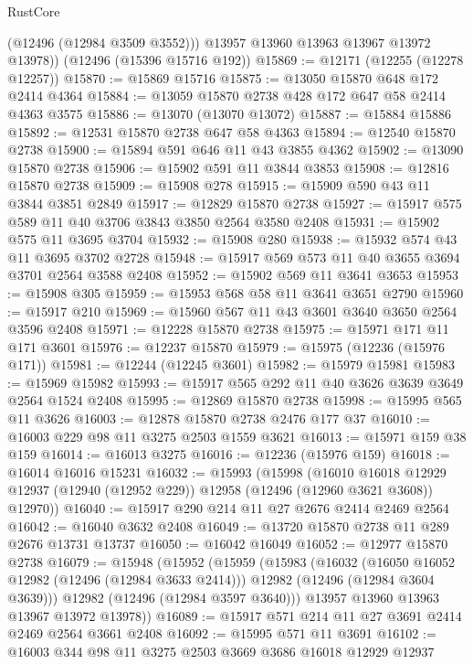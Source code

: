 \begin{lexlean}{RustCore}
\begin{coremodule}
          (@12496 (@12984 @3509 @3552)))
        @13957
        @13960
        @13963
        @13967
        @13972
        @13978))
    (@12496 (@15396 @15716 @192))
@15869 := @12171 (@12255 (@12278 @12257))
@15870 := @15869 @15716
@15875 := @13050 @15870 @648 @172 @2414 @4364
@15884 := @13059 @15870 @2738 @428 @172 @647 @58 @2414 @4363 @3575
@15886 := @13070 (@13070 @13072)
@15887 := @15884 @15886
@15892 := @12531 @15870 @2738 @647 @58 @4363
@15894 := @12540 @15870 @2738
@15900 := @15894 @591 @646 @11 @43 @3855 @4362
@15902 := @13090 @15870 @2738
@15906 := @15902 @591 @11 @3844 @3853
@15908 := @12816 @15870 @2738
@15909 := @15908 @278
@15915 := @15909 @590 @43 @11 @3844 @3851 @2849
@15917 := @12829 @15870 @2738
@15927 := @15917 @575 @589 @11 @40 @3706 @3843 @3850 @2564 @3580 @2408
@15931 := @15902 @575 @11 @3695 @3704
@15932 := @15908 @280
@15938 := @15932 @574 @43 @11 @3695 @3702 @2728
@15948 := @15917 @569 @573 @11 @40 @3655 @3694 @3701 @2564 @3588 @2408
@15952 := @15902 @569 @11 @3641 @3653
@15953 := @15908 @305
@15959 := @15953 @568 @58 @11 @3641 @3651 @2790
@15960 := @15917 @210
@15969 := @15960 @567 @11 @43 @3601 @3640 @3650 @2564 @3596 @2408
@15971 := @12228 @15870 @2738
@15975 := @15971 @171 @11 @171 @3601
@15976 := @12237 @15870
@15979 := @15975 (@12236 (@15976 @171))
@15981 := @12244 (@12245 @3601)
@15982 := @15979 @15981
@15983 := @15969 @15982
@15993 := @15917 @565 @292 @11 @40 @3626 @3639 @3649 @2564 @1524 @2408
@15995 := @12869 @15870 @2738
@15998 := @15995 @565 @11 @3626
@16003 := @12878 @15870 @2738 @2476 @177 @37
@16010 := @16003 @229 @98 @11 @3275 @2503 @1559 @3621
@16013 := @15971 @159 @38 @159
@16014 := @16013 @3275
@16016 := @12236 (@15976 @159)
@16018 := @16014 @16016 @15231
@16032 := @15993
    (@15998
      (@16010
        @16018
        @12929
        @12937
        (@12940 (@12952 @229))
        @12958
        (@12496 (@12960 @3621 @3608))
        @12970))
@16040 := @15917 @290 @214 @11 @27 @2676 @2414 @2469 @2564
@16042 := @16040 @3632 @2408
@16049 := @13720 @15870 @2738 @11 @289 @2676 @13731 @13737
@16050 := @16042 @16049
@16052 := @12977 @15870 @2738
@16079 := @15948
    (@15952
      (@15959
        (@15983
          (@16032
            (@16050 @16052 @12982 (@12496 (@12984 @3633 @2414)))
            @12982
            (@12496 (@12984 @3604 @3639)))
          @12982
          (@12496 (@12984 @3597 @3640)))
        @13957
        @13960
        @13963
        @13967
        @13972
        @13978))
@16089 := @15917 @571 @214 @11 @27 @3691 @2414 @2469 @2564 @3661 @2408
@16092 := @15995 @571 @11 @3691
@16102 := @16003 @344 @98 @11 @3275 @2503 @3669 @3686 @16018 @12929 @12937

\end{coremodule}
\end{lexlean}
